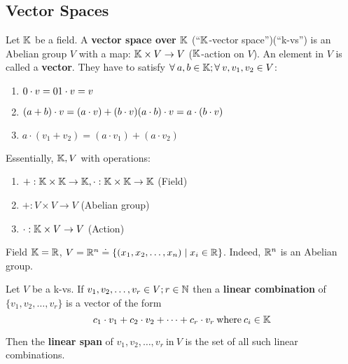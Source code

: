 \subsection{Vector Spaces}
\begin{definition} 
    Let \(\mathbb{K}\) be a field. A \textbf{vector space over \(\mathbb{K}\)} (``\(\mathbb{K}\)-vector space'')(``k-vs'') is an Abelian group \(V\) with a map: \(\mathbb{K} \times V \to V\) (\(\mathbb{K}\)-action on \(V\)). An element in \(V\) is called a \textbf{vector}. They have to satisfy \(\forall a, b \in \bbk; \forall v, v_1, v_2 \in V\):
    \begin{enumerate}
        \item \(0 \cdot v = 0\\ 1 \cdot v = v\)
        \item \((a + b) \cdot v = (a \cdot v) + (b \cdot v)\\ (a \cdot b) \cdot v = a \cdot (b \cdot v)\)
        \item \(a \cdot (v_1 +  v_2) = (a \cdot v_1) + (a \cdot v_2)\)
    \end{enumerate}

    Essentially, \(\mathbb{K}, V\) with operations:
    \begin{enumerate}
        \item \(+: \mathbb{K} \times \mathbb{K} \to \mathbb{K}, \cdot: \mathbb{K} \times \mathbb{K} \to \mathbb{K}\) (Field)
        \item \(+: V \times V \to V\) (Abelian group)
        \item \(\cdot: \mathbb{K} \times V \to V\) (Action)
    \end{enumerate}
\end{definition}

\begin{example}
    Field \(\mathbb{K} = \mathbb{R}\), \(V = \mathbb{R}^n \doteq \{(x_1, x_2, \dots, x_n) \mid x_i \in \mathbb{R}\}\). Indeed, \(\mathbb{R}^n\) is an Abelian group.
\end{example}

\begin{definition} 
    Let \(V\) be a k-vs. If \(v_1, v_2, \dots, v_r \in V; r \in \mathbb{N}\) then a \textbf{linear combination} of \(\{v_1, v_2, \dots, v_r\}\) is a vector of the form \[
        c_1 \cdot v_1 + c_2 \cdot v_2 + \dots + c_r \cdot v_r \:\text{where}\: c_i \in \mathbb{K}
    \]
\end{definition}

\begin{definition} 
    Then the \textbf{linear span} of \(v_1, v_2, \dots, v_r \:\text{in}\: V\) is the set of all such linear combinations.
\end{definition}

